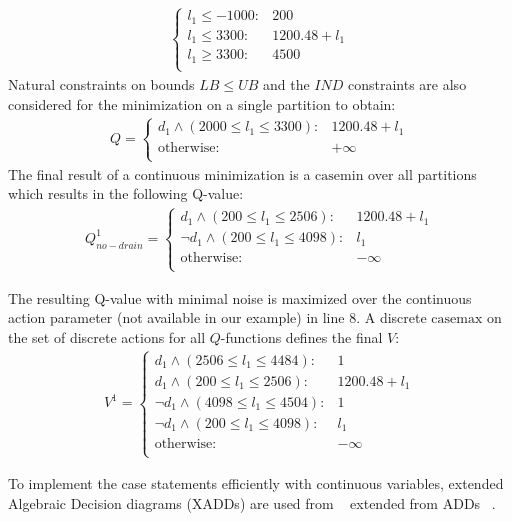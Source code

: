 \documentclass[letterpaper]{article}
\newcommand{\casemax}{\mathrm{casemax}}
\newcommand{\casemin}{\mathrm{casemin}}
\newcommand{\UB}{\mathit{UB}}
\newcommand{\LB}{\mathit{LB}}
\begin{document}
\begin{itemize}
{\begin{align}
\begin{cases}
 l_1\leq - 1000 :&  200 \\
 l_1\leq  3300 :&  1200.48 + l_1 \\
  l_1\geq  3300 :&  4500 \\
\end{cases} \nonumber
\end{align}
}
Natural constraints on bounds $\LB \leq \UB$ and the $IND$ constraints are also considered for the minimization on a single partition to obtain: 
{\footnotesize
\begin{align}
Q =  
\begin{cases}
d_1 \land ( 2000 \leq l_1 \leq 3300 ):&  1200.48 + l_1 \\
\text{otherwise} :&  + \infty \\ 
\end{cases} \nonumber
\end{align}
}
The final result of a continuous minimization is a $\casemin$ over all partitions which results in the following Q-value:
{\footnotesize
\begin{align}
Q^1_{\mathit{no}-\mathit{drain}} =  
\begin{cases}
d_1 \land (200 \leq l_1 \leq 2506) : & 1200.48 + l_1 \\
\neg d_1 \land (200 \leq l_1 \leq 4098) : & l_1 \\
\text{otherwise} : & -\infty \\ 
\end{cases} \nonumber
\end{align}
}

The resulting Q-value with minimal noise is maximized over the continuous action parameter (not available in our example) in line 8. A discrete $\casemax$ on the set of discrete actions for all $Q$-functions defines the final $V$:
{\footnotesize
\begin{align}
V^1 =  
\begin{cases}
d_1 \land (2506 \leq l_1 \leq 4484): & 1 \\
d_1 \land (200 \leq l_1 \leq 2506): & 1200.48 + l_1 \\
\neg d_1 \land (4098 \leq l_1 \leq 4504) : & 1 \\
\neg d_1 \land (200 \leq l_1 \leq 4098) : & l_1 \\
\text{otherwise} : & -\infty \\ 
\end{cases} \nonumber
\end{align}
}
\end{itemize}
To implement the case statements efficiently with continuous
variables, extended Algebraic Decision diagrams (XADDs) are used from
~\cite{sanner_uai11} extended from ADDs
~\cite{bahar93add}. 
\end{document}
